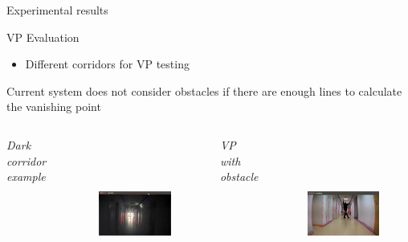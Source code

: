 \documentclass[8pt]{beamer}
\begin{document}
{{\begin{frame}{Experimental results}
\end{frame}


\begin{frame}{VP Evaluation}
\begin{itemize}
 \item Different corridors for VP testing
\end{itemize}
Current system does not consider obstacles if there are enough lines to calculate the vanishing point\\
\vspace{0.5cm}
\begin{columns}
  {\centering \small{\textit{Dark corridor example}\par}}
  \begin{figure}
  \includegraphics[width=6cm, height=5cm]{images/darkcorridor.png}
  \end{figure}
  {\centering \small{\textit{VP with obstacle}\par}}
  \begin{figure}
   \includegraphics[width=6cm, height=5cm]{images/VPwithobstacle.png}%
   \end{figure}
\end{columns}
\end{frame}

}}
\end{document}
